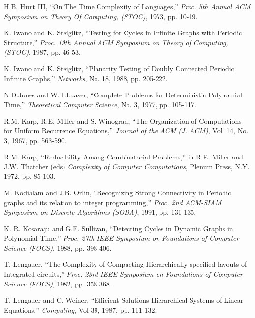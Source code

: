 \begin{thebibliography}{HMRR93}
 H.B. Hunt III,
``On The Time Complexity of Languages,''
{\em Proc.  5th Annual ACM Symposium on Theory Of Computing, (STOC)}, 
1973, pp. 10-19.






  K. Iwano and  K. Steiglitz,
``Testing for Cycles in  Infinite Graphs with Periodic Structure,''
{\em Proc.  19th Annual ACM Symposium on Theory of Computing, (STOC)}, 
1987, pp. 46-53.



  K. Iwano and  K. Steiglitz,
``Planarity Testing of Doubly Connected Periodic Infinite Graphs,''
{\em Networks},
No. 18, 1988, pp. 205-222.




N.D.Jones and W.T.Laaser, 
``Complete Problems for Deterministic Polynomial Time,'' 
{\em Theoretical Computer Science},
No.  3, 1977, pp. 105-117.


R.M. Karp, R.E. Miller and S. Winograd,
``The Organization of Computations for Uniform Recurrence Equations,''
{\em Journal of the ACM (J. ACM)}, Vol. 14, No. 3, 1967, pp. 563-590.




R.M. Karp,
``Reducibility Among Combinatorial Problems,''
in R.E. Miller and J.W. Thatcher (eds)
{\em Complexity of Computer  Computations}, Plenum Press,
N.Y. 1972, pp. 85-103.





M. Kodialam and  J.B. Orlin,
``Recognizing Strong Connectivity in Periodic graphs
and its relation to integer programming,''
{\em Proc. 2nd  ACM-SIAM Symposium on Discrete Algorithms (SODA)},
1991, pp. 131-135.





  K. R. Kosaraju and G.F. Sullivan,
``Detecting Cycles in  Dynamic Graphs in Polynomial Time,''
{\em Proc.  27th IEEE Symposium on Foundations of Computer Science (FOCS)}, 
1988, pp. 398-406.




T. Lengauer,
``The Complexity of  Compacting Hierarchically specified layouts of
Integrated circuits,''
{\em Proc. 23rd IEEE Symposium on Foundations of Computer Science (FOCS)}, 
1982, pp. 358-368.


T. Lengauer and  C. Weiner,
``Efficient Solutions Hierarchical Systems of Linear Equations,''  
{\em  Computing}, Vol 39, 1987, pp. 111-132.





\end{thebibliography}
